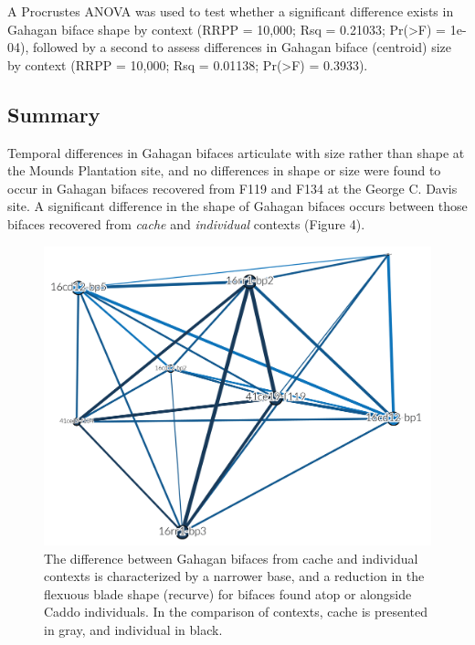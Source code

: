 \documentclass[]{interact}
\theoremstyle{plain}%
\theoremstyle{definition}
\theoremstyle{remark}
\begin{document}
A Procrustes ANOVA was used to test whether a significant difference
exists in Gahagan biface shape by context (RRPP = 10,000; Rsq = 0.21033;
Pr(\textgreater F) = 1e-04), followed by a second to assess differences
in Gahagan biface (centroid) size by context (RRPP = 10,000; Rsq =
0.01138; Pr(\textgreater F) = 0.3933).

\hypertarget{summary}{%
\subsection{Summary}\label{summary}}

Temporal differences in Gahagan bifaces articulate with size rather than
shape at the Mounds Plantation site, and no differences in shape or size
were found to occur in Gahagan bifaces recovered from F119 and F134 at
the George C. Davis site. A significant difference in the shape of
Gahagan bifaces occurs between those bifaces recovered from \emph{cache}
and \emph{individual} contexts (Figure 4).

\begin{figure}

{\centering \includegraphics[width=1\linewidth]{img/fig04} 

}

\caption{The difference between Gahagan bifaces from cache and individual contexts is characterized by a narrower base, and a reduction in the flexuous blade shape (recurve) for bifaces found atop or alongside Caddo individuals. In the comparison of contexts, cache is presented in gray, and individual in black.}\label{fig:mshape.bpractice}
\end{figure}
\end{document}
